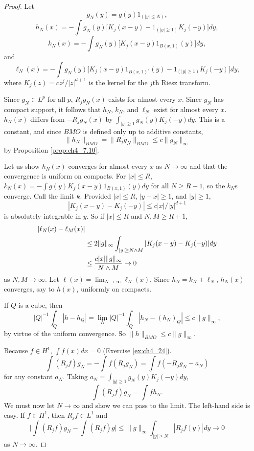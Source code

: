 \begin{proof}
Let
\[
    g_N(y) = g(y)1_{(|y|\leq N)},
\]
\[
    h_N(x) = -\int g_N(y)\big[K_j(x-y) - 1_{(|y|\geq 1)}K_j(-y)\big]dy,
\]
\[
    k_N(x) = -\int g_N(y)\big[K_j(x-y)1_{B(x,1)}(y)\big]dy,
\]
and
\[
    \ell_N(x) = -\int g_N(y)\big[K_j(x-y)1_{B(x,1)^c}(y) - 1_{(|y|\geq 1)}K_j(-y)\big]dy,
\]
where $K_j(z) = cz^j/|z|^{d+1}$ is the kernel for the $j$th Riesz transform.

Since $g_N \in L^p$ for all $p$, $R_jg_N(x)$ exists for almost every $x$. Since $g_N$ has compact support, it follows that $h_N$, $k_N$, and $\ell_N$ exist for almost every $x$. $h_N(x)$ differs from $-R_jg_N(x)$ by $\int_{|y|\geq 1} g_N(y)K_j(-y)dy$. This is a constant, and since $BMO$ is defined only up to additive constants,
\[
    \|h_N\|_{BMO} = \|R_jg_N\|_{BMO} \leq c\|g_N\|_\infty
\]
by Proposition \ref{prop:ch4_7.10}.

Let us show $h_N(x)$ converges for almost every $x$ as $N \to \infty$ and that the convergence is uniform on compacts. For $|x| \leq R$, $k_N(x) = -\int g(y)K_j(x-y)1_{B(x,1)}(y)dy$ for all $N \geq R + 1$, so the $k_N$s converge. Call the limit $k$. Provided $|x| \leq R$, $|y-x| \geq 1$, and $|y| \geq 1$,
\begin{equation}\label{eq:ch4_7.20}
|K_j(x-y) - K_j(-y)| \leq c|x|/|y|^{d+1}
\end{equation}
is absolutely integrable in $y$. So if $|x| \leq R$ and $N,M \geq R + 1$,
\begin{align}\label{eq:ch4_7.21}
    |\ell_N(x) - \ell_M(x)|& \\
    &\leq 2\|g\|_\infty \int_{|y|\geq N\wedge M} |K_j(x-y) - K_j(-y)|dy \notag \\
    &\leq \frac{c|x| \|g\|_\infty}{N \wedge M} \to 0 \notag
\end{align}
as $N,M \to \infty$. Let $\ell(x) = \lim_{N\to\infty} \ell_N(x)$. Since $h_N = k_N + \ell_N$, $h_N(x)$ converges, say to $h(x)$, uniformly on compacts.

If $Q$ is a cube, then
\[
    |Q|^{-1}\int_Q |h - h_Q| = \lim_N |Q|^{-1}\int_Q |h_N - (h_N)_Q| \leq c\|g\|_\infty,
\]
by virtue of the uniform convergence. So $\|h\|_{BMO} \leq c\|g\|_\infty$.

Because $f \in H^1$, $\int f(x)dx = 0$ (Exercise \ref{ex:ch4_24}).
\[
    \int (R_jf)g_N = -\int f(R_jg_N) = \int f(-R_jg_N - a_N)
\]
for any constant $a_N$. Taking $a_N = \int_{|y|\geq 1} g_N(y)K_j(-y)dy$,
\[
    \int (R_jf)g_N = \int fh_N.
\]
We must now let $N \to \infty$ and show we can pass to the limit. The left-hand side is easy. If $f \in H^1$, then $R_jf \in L^1$ and
\[
    \Big|\int (R_jf)g_N - \int (R_jf)g\Big| \leq \|g\|_\infty \int_{|y|\geq N} |R_jf(y)|dy \to 0
\]
as $N \to \infty$.


\end{proof}
